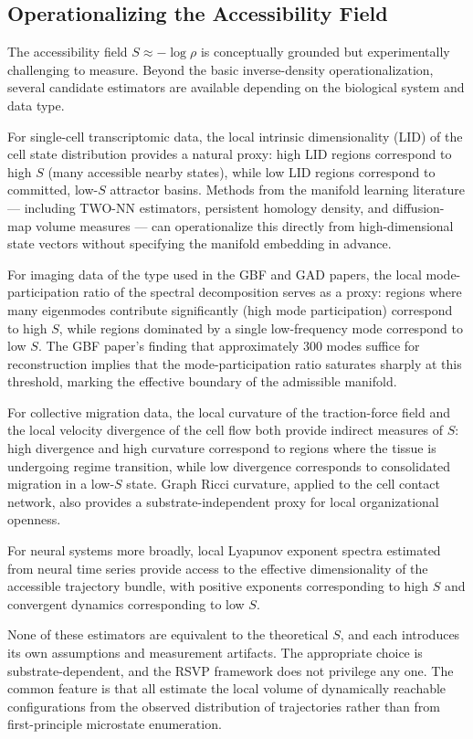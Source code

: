 \documentclass[11pt,a4paper]{article}
\theoremstyle{plain}
\theoremstyle{definition}
\begin{document}
\subsection{Operationalizing the Accessibility Field}

The accessibility field $S \approx -\log\rho$ is conceptually grounded but
experimentally challenging to measure. Beyond the basic inverse-density operationalization,
several candidate estimators are available depending on the biological system and data type.

For single-cell transcriptomic data, the local intrinsic dimensionality (LID) of
the cell state distribution provides a natural proxy: high LID regions correspond
to high $S$ (many accessible nearby states), while low LID regions correspond to
committed, low-$S$ attractor basins. Methods from the manifold learning literature
--- including TWO-NN estimators, persistent homology density, and diffusion-map
volume measures --- can operationalize this directly from high-dimensional state
vectors without specifying the manifold embedding in advance.

For imaging data of the type used in the GBF and GAD papers, the local
mode-participation ratio of the spectral decomposition serves as a proxy: regions
where many eigenmodes contribute significantly (high mode participation) correspond
to high $S$, while regions dominated by a single low-frequency mode correspond to
low $S$. The GBF paper's finding that approximately 300 modes suffice for reconstruction
implies that the mode-participation ratio saturates sharply at this threshold, marking
the effective boundary of the admissible manifold.

For collective migration data, the local curvature of the traction-force field and
the local velocity divergence of the cell flow both provide indirect measures of $S$:
high divergence and high curvature correspond to regions where the tissue is undergoing
regime transition, while low divergence corresponds to consolidated migration in a
low-$S$ state. Graph Ricci curvature, applied to the cell contact network, also
provides a substrate-independent proxy for local organizational openness.

For neural systems more broadly, local Lyapunov exponent spectra estimated from
neural time series provide access to the effective dimensionality of the accessible
trajectory bundle, with positive exponents corresponding to high $S$ and convergent
dynamics corresponding to low $S$.

None of these estimators are equivalent to the theoretical $S$, and each introduces
its own assumptions and measurement artifacts. The appropriate choice is
substrate-dependent, and the RSVP framework does not privilege any one. The
common feature is that all estimate the local volume of dynamically reachable
configurations from the observed distribution of trajectories rather than from
first-principle microstate enumeration.
\end{document}
